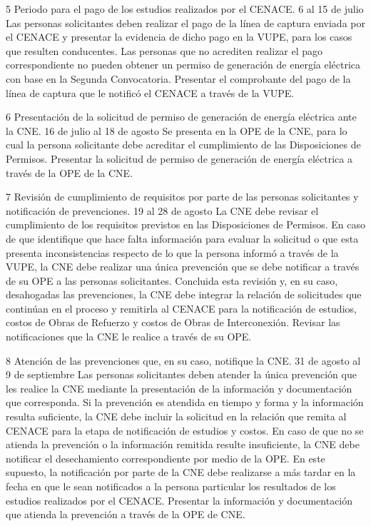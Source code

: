  5
 Periodo para el pago de los estudios realizados por el CENACE.
 6 al 15 de julio
 Las personas solicitantes deben realizar el pago de la línea de captura enviada por el CENACE y presentar la evidencia de dicho pago en la VUPE, para los casos que resulten conducentes. Las personas que no acrediten realizar el pago correspondiente no pueden obtener un permiso de generación de energía eléctrica con base en la Segunda Convocatoria.
 Presentar el comprobante del pago de la línea de captura que le notificó el CENACE a través de la VUPE.
 
 6
 Presentación de la solicitud de permiso de generación de energía eléctrica ante la CNE.
 16 de julio al 18 de agosto
 Se presenta en la OPE de la CNE, para lo cual la persona solicitante debe acreditar el cumplimiento de las Disposiciones de Permisos.
 Presentar la solicitud de permiso de generación de energía eléctrica a través de la OPE de la CNE.
 
 7
 Revisión de cumplimiento de requisitos por parte de las personas solicitantes y notificación de prevenciones.
 19 al 28 de agosto
 La CNE debe revisar el cumplimiento de los requisitos previstos en las Disposiciones de Permisos. En caso de que identifique que hace falta información para evaluar la solicitud o que esta presenta inconsistencias respecto de lo que la persona informó a través de la VUPE, la CNE debe realizar una única prevención que se debe notificar a través de su OPE a las personas solicitantes. Concluida esta revisión y, en su caso, desahogadas las prevenciones, la CNE debe integrar la relación de solicitudes que continúan en el proceso y remitirla al CENACE para la notificación de estudios, costos de Obras de Refuerzo y costos de Obras de Interconexión.
 Revisar las notificaciones que la CNE le realice a través de su OPE.
 
 8
 Atención de las prevenciones que, en su caso, notifique la CNE.
 31 de agosto al 9 de septiembre
 Las personas solicitantes deben atender la única prevención que les realice la CNE mediante la presentación de la información y documentación que corresponda. Si la prevención es atendida en tiempo y forma y la información resulta suficiente, la CNE debe incluir la solicitud en la relación que remita al CENACE para la etapa de notificación de estudios y costos. En caso de que no se atienda la prevención o la información remitida resulte insuficiente, la CNE debe notificar el desechamiento correspondiente por medio de la OPE. En este supuesto, la notificación por parte de la CNE debe realizarse a más tardar en la fecha en que le sean notificados a la persona particular los resultados de los estudios realizados por el CENACE.
 Presentar la información y documentación que atienda la prevención a través de la OPE de CNE.
 
